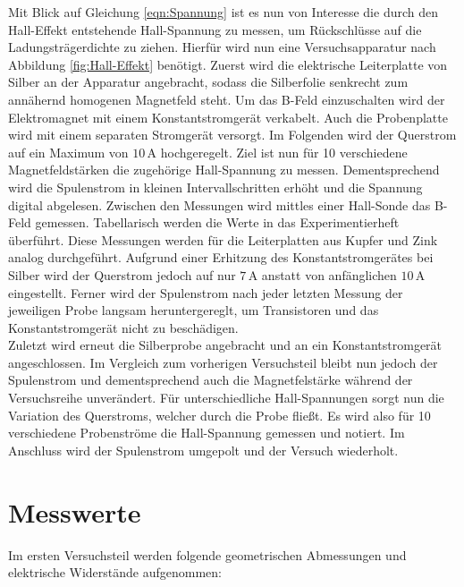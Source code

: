\noindent Mit Blick auf Gleichung \eqref{eqn:Spannung} ist es nun von Interesse die durch den Hall-Effekt entstehende 
Hall-Spannung zu messen, um Rückschlüsse auf die Ladungsträgerdichte zu ziehen. Hierfür wird nun eine Versuchsapparatur 
nach Abbildung \ref{fig:Hall-Effekt} benötigt. Zuerst wird die elektrische Leiterplatte von Silber an der Apparatur 
angebracht, sodass die Silberfolie senkrecht zum annähernd homogenen Magnetfeld steht. Um das B-Feld einzuschalten wird 
der Elektromagnet mit einem Konstantstromgerät verkabelt. Auch die Probenplatte wird mit einem separaten Stromgerät versorgt.
Im Folgenden wird der Querstrom auf ein Maximum von $10\,\unit{\ampere}$ hochgeregelt. Ziel ist nun für 10 verschiedene 
Magnetfeldstärken die zugehörige Hall-Spannung zu messen. Dementsprechend wird die Spulenstrom in kleinen Intervallschritten 
erhöht und die Spannung digital abgelesen. Zwischen den Messungen wird mittles einer Hall-Sonde das B-Feld gemessen. Tabellarisch 
werden die Werte in das Experimentierheft überführt. Diese Messungen werden für die Leiterplatten aus Kupfer und Zink analog 
durchgeführt. Aufgrund einer Erhitzung des Konstantstromgerätes bei Silber wird der Querstrom jedoch auf nur $7\,\unit{\ampere}$
anstatt von anfänglichen $10\,\unit{\ampere}$ eingestellt. Ferner wird der Spulenstrom nach jeder letzten Messung der jeweiligen 
Probe langsam heruntergereglt, um Transistoren und das Konstantstromgerät nicht zu beschädigen.\\

\noindent Zuletzt wird erneut die Silberprobe angebracht und an ein Konstantstromgerät angeschlossen. Im Vergleich zum vorherigen 
Versuchsteil bleibt nun jedoch der Spulenstrom und dementsprechend auch die Magnetfelstärke während der Versuchsreihe unverändert.
Für unterschiedliche Hall-Spannungen sorgt nun die Variation des Querstroms, welcher durch die Probe fließt. Es wird also für 10 
verschiedene Probenströme die Hall-Spannung gemessen und notiert. Im Anschluss wird der Spulenstrom umgepolt und der Versuch wiederholt.\\

\noindent 

\section{Messwerte}
\label{sec:Messwerte}

Im ersten Versuchsteil werden folgende geometrischen Abmessungen und elektrische Widerstände aufgenommen:

